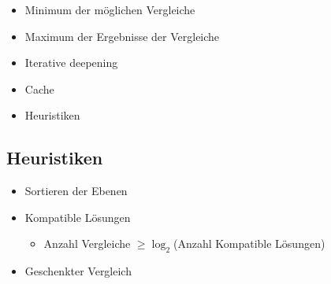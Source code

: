 \begin{frame}{\insertsection}
  \begin{itemize}
    \item<1-> Minimum der möglichen Vergleiche
    \item<1-> Maximum der Ergebnisse der Vergleiche
    \item<2-> Iterative deepening
    \item<3-> Cache
    \item<4-> Heuristiken
  \end{itemize}
\end{frame}


\subsection{Heuristiken}

\begin{frame}{\insertsubsection}

  \begin{itemize}
    \item<+-> Sortieren der Ebenen
    \item<+-> Kompatible Lösungen
      \begin{itemize}
        \item Anzahl Vergleiche $\geq \log_2$(Anzahl Kompatible Lösungen)
      \end{itemize}
    \item<+-> Geschenkter Vergleich
      \begin{figure}
        \centering
      \end{figure}
  \end{itemize}

\end{frame}


